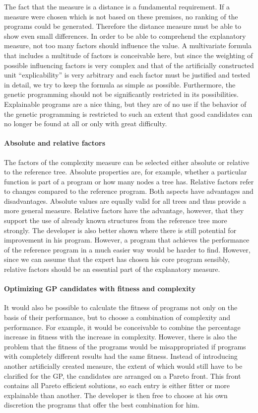 The fact that the measure is a distance is a fundamental requirement. If a measure were chosen which is not based on these premises, no ranking of the programs could be generated. Therefore the distance measure must be able to show even small differences. In order to be able to comprehend the explanatory measure, not too many factors should influence the value. A multivariate formula that includes a multitude of factors is conceivable here, but since the weighting of possible influencing factors is very complex and that of the artificially constructed unit ``explicability'' is very arbitrary and each factor must be justified and tested in detail, we try to keep the formula as simple as possible.  
Furthermore, the genetic programming should not be significantly restricted in its possibilities. Explainable programs are a nice thing, but they are of no use if the behavior of the genetic programming is restricted to such an extent that good candidates can no longer be found at all or only with great difficulty.

\paragraph{Absolute and relative factors}
The factors of the complexity measure can be selected either absolute or relative to the reference tree.  Absolute properties are, for example, whether a particular function is part of a program or how many nodes a tree has. Relative factors refer to changes compared to the reference program.  Both aspects have advantages and disadvantages. Absolute values are equally valid for all trees and thus provide a more general measure. Relative factors have the advantage, however, that they support the use of already known structures from the reference tree more strongly. The developer is also better shown where there is still potential for improvement in his program. However, a program that achieves the performance of the reference program in a much easier way would be harder to find. However, since we can assume that the expert has chosen his core program sensibly, relative factors should be an essential part of the explanatory measure.

\paragraph{Optimizing GP candidates with fitness and complexity}
It would also be possible to calculate the fitness of programs not only on the basis of their performance, but to choose a combination of complexity and performance. For example, it would be conceivable to combine the percentage increase in fitness with the increase in complexity. However, there is also the problem that the fitness of the programs would be misappropriated if programs with completely different results had the same fitness. Instead of introducing another artificially created measure, the extent of which would still have to be clarified for the GP, the candidates are arranged on a Pareto front. This front contains all Pareto efficient solutions, so each entry is either fitter or more explainable than another. The developer is then free to choose at his own discretion the programs that offer the best combination for him.

